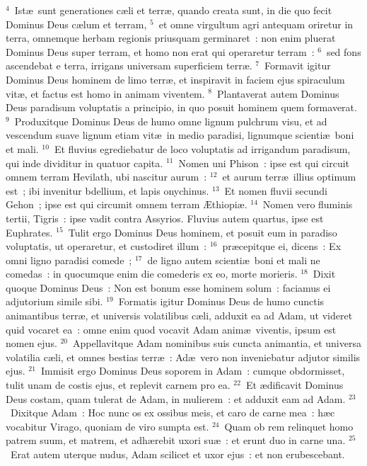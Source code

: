 ${}^{4}$~Ist\ae\ sunt generationes c\ae li et terr\ae , quando creata sunt, in die quo fecit Dominus Deus c\ae lum et terram,
${}^{5}$~et omne virgultum agri antequam oriretur in terra, omnemque herbam regionis priusquam germinaret~: non enim pluerat Dominus Deus super terram, et homo non erat qui operaretur terram~:
${}^{6}$~sed fons ascendebat e terra, irrigans universam superficiem terr\ae .
${}^{7}$~Formavit igitur Dominus Deus hominem de limo terr\ae , et inspiravit in faciem ejus spiraculum vit\ae , et factus est homo in animam viventem.
${}^{8}$~Plantaverat autem Dominus Deus paradisum voluptatis a principio, in quo posuit hominem quem formaverat.
${}^{9}$~Produxitque Dominus Deus de humo omne lignum pulchrum visu, et ad vescendum suave lignum etiam vit\ae\ in medio paradisi, lignumque scienti\ae\ boni et mali.
${}^{10}$~Et fluvius egrediebatur de loco voluptatis ad irrigandum paradisum, qui inde dividitur in quatuor capita.
${}^{11}$~Nomen uni Phison~: ipse est qui circuit omnem terram Hevilath, ubi nascitur aurum~:
${}^{12}$~et aurum terr\ae\ illius optimum est~; ibi invenitur bdellium, et lapis onychinus.
${}^{13}$~Et nomen fluvii secundi Gehon~; ipse est qui circumit omnem terram \AE thiopi\ae .
${}^{14}$~Nomen vero fluminis tertii, Tigris~: ipse vadit contra Assyrios. Fluvius autem quartus, ipse est Euphrates.
${}^{15}$~Tulit ergo Dominus Deus hominem, et posuit eum in paradiso voluptatis, ut operaretur, et custodiret illum~:
${}^{16}$~pr\ae cepitque ei, dicens~: Ex omni ligno paradisi comede~;
${}^{17}$~de ligno autem scienti\ae\ boni et mali ne comedas~: in quocumque enim die comederis ex eo, morte morieris.
${}^{18}$~Dixit quoque Dominus Deus~: Non est bonum esse hominem solum~: faciamus ei adjutorium simile sibi.
${}^{19}$~Formatis igitur Dominus Deus de humo cunctis animantibus terr\ae , et universis volatilibus c\ae li, adduxit ea ad Adam, ut videret quid vocaret ea~: omne enim quod vocavit Adam anim\ae\ viventis, ipsum est nomen ejus.
${}^{20}$~Appellavitque Adam nominibus suis cuncta animantia, et universa volatilia c\ae li, et omnes bestias terr\ae~: Ad\ae\ vero non inveniebatur adjutor similis ejus.
${}^{21}$~Immisit ergo Dominus Deus soporem in Adam~: cumque obdormisset, tulit unam de costis ejus, et replevit carnem pro ea.
${}^{22}$~Et \ae dificavit Dominus Deus costam, quam tulerat de Adam, in mulierem~: et adduxit eam ad Adam.
${}^{23}$~Dixitque Adam~: Hoc nunc os ex ossibus meis, et caro de carne mea~: h\ae c vocabitur Virago, quoniam de viro sumpta est.
${}^{24}$~Quam ob rem relinquet homo patrem suum, et matrem, et adh\ae rebit uxori su\ae~: et erunt duo in carne una.
${}^{25}$~Erat autem uterque nudus, Adam scilicet et uxor ejus~: et non erubescebant.

